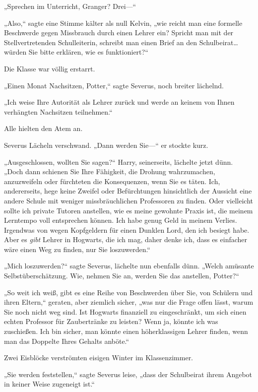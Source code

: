 {„Sprechen im Unterricht, Granger? Drei—“

„Also,“ sagte eine Stimme kälter als null Kelvin, „wie reicht man eine formelle Beschwerde gegen Missbrauch durch einen Lehrer ein? Spricht man mit der Stellvertretenden Schulleiterin, schreibt man einen Brief an den Schulbeirat… würden Sie bitte erklären, wie es funktioniert?“

Die Klasse war völlig erstarrt.

„Einen Monat Nachsitzen, Potter,“ sagte Severus, noch breiter lächelnd.

„Ich weise Ihre Autorität als Lehrer zurück und werde an keinem von Ihnen verhängten Nachsitzen teilnehmen.“

Alle hielten den Atem an.

Severus Lächeln verschwand. „Dann werden Sie—“ er stockte kurz.

„Ausgeschlossen, wollten Sie sagen?“ Harry, seinerseits, lächelte jetzt dünn. „Doch dann schienen Sie Ihre Fähigkeit, die Drohung wahrzumachen, anzuzweifeln oder fürchteten die Konsequenzen, wenn Sie es täten. Ich, andererseits, hege keine Zweifel oder Befürchtungen hinsichtlich der Aussicht eine andere Schule mit weniger missbräuchlichen Professoren zu finden. Oder vielleicht sollte ich private Tutoren anstellen, wie es meine gewohnte Praxis ist, die meinem Lerntempo voll entsprechen können. Ich habe genug Geld in meinem Verlies. Irgendwas von wegen Kopfgeldern für einen Dunklen Lord, den ich besiegt habe. Aber es \emph{gibt} Lehrer in Hogwarts, die ich mag, daher denke ich, dass es einfacher wäre einen Weg zu finden, nur Sie loszuwerden.“

„Mich loszuwerden?“ sagte Severus, lächelte nun ebenfalls dünn. „Welch amüsante Selbstüberschätzung. Wie, nehmen Sie an, werden Sie das anstellen, Potter?“

„So weit ich weiß, gibt es eine Reihe von Beschwerden über Sie, von Schülern und ihren Eltern,“ geraten, aber ziemlich sicher, „was nur die Frage offen lässt, warum Sie noch nicht weg sind. Ist Hogwarts finanziell zu eingeschränkt, um sich einen echten Professor für Zaubertränke zu leisten? Wenn ja, könnte ich was zuschießen. Ich bin sicher, man könnte einen höherklassigen Lehrer finden, wenn man das Doppelte Ihres Gehalts anböte.“

Zwei Eisblöcke verströmten eisigen Winter im Klassenzimmer.

„Sie werden feststellen,“ sagte Severus leise, „dass der Schulbeirat ihrem Angebot in keiner Weise zugeneigt ist.“

}
